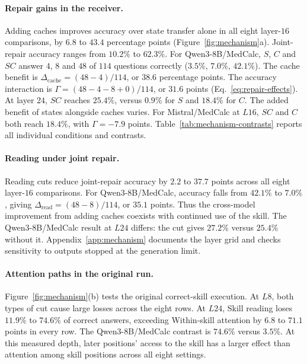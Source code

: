 \paragraph{Repair gains in the receiver.}
Adding caches improves accuracy over state transfer alone in all eight
layer-$16$ comparisons, by $6.8$ to $43.4$ percentage points
(Figure~\ref{fig:mechanism}a). Joint-repair accuracy ranges from $10.2\%$
to $62.3\%$. For Qwen3-8B/MedCalc, $S$, $C$ and $SC$ answer $4$, $8$
and $48$ of $114$ questions correctly ($3.5\%$, $7.0\%$, $42.1\%$).
The cache benefit is $\Delta_{\mathrm{cache}}=(48-4)/114$, or $38.6$
percentage points. The accuracy interaction is
$\Gamma=(48-4-8+0)/114$, or $31.6$ points (Eq.~\eqref{eq:repair-effects}).
At layer $24$, $SC$ reaches $25.4\%$, versus $0.9\%$ for $S$ and
$18.4\%$ for $C$. The added benefit of states alongside caches varies.
For Mistral/MedCalc at $L16$, $SC$ and $C$ both reach $18.4\%$, with
$\Gamma=-7.9$ points. Table~\ref{tab:mechanism-contrasts} reports all
individual conditions and contrasts.

\paragraph{Reading under joint repair.}
Reading cuts reduce joint-repair accuracy by $2.2$ to $37.7$ points
across all eight layer-$16$ comparisons. For Qwen3-8B/MedCalc, accuracy falls
from $42.1\%$ to $7.0\%$, giving $\Delta_{\mathrm{read}}=(48-8)/114$,
or $35.1$ points. Thus the cross-model improvement from adding caches
coexists with continued use of the skill. The Qwen3-8B/MedCalc result at
$L24$ differs: the cut gives $27.2\%$ versus $25.4\%$ without it.
Appendix~\ref{app:mechanism} documents the layer grid and checks sensitivity
to outputs stopped at the generation limit.

\paragraph{Attention paths in the original run.}
Figure~\ref{fig:mechanism}(b) tests the original correct-skill execution.
At $L8$, both types of cut cause large losses across the eight rows.
At $L24$, Skill reading loses $11.9\%$ to $74.6\%$ of correct answers,
exceeding Within-skill attention by $6.8$ to $71.1$ points in every row.
The Qwen3-8B/MedCalc contrast is $74.6\%$ versus $3.5\%$.
At this measured depth, later positions' access to the skill has a
larger effect than attention among skill positions across all eight settings.

